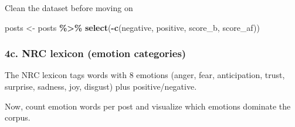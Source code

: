 \documentclass[
]{article}
\newenvironment{Shaded}{\begin{snugshade}}{\end{snugshade}}
\newcommand{\FunctionTok}[1]{\textcolor[rgb]{0.13,0.29,0.53}{\textbf{#1}}}
\newcommand{\NormalTok}[1]{#1}
\newcommand{\OtherTok}[1]{\textcolor[rgb]{0.56,0.35,0.01}{#1}}
\newcommand{\SpecialCharTok}[1]{\textcolor[rgb]{0.81,0.36,0.00}{\textbf{#1}}}
\begin{document}
Clean the dataset before moving on

\begin{Shaded}
\begin{Highlighting}[]
\NormalTok{posts }\OtherTok{\textless{}{-}}\NormalTok{ posts }\SpecialCharTok{\%\textgreater{}\%} 
  \FunctionTok{select}\NormalTok{(}\SpecialCharTok{{-}}\FunctionTok{c}\NormalTok{(negative, positive, score\_b, score\_af))}
\end{Highlighting}
\end{Shaded}

\subsubsection{4c. NRC lexicon (emotion
categories)}\label{c.-nrc-lexicon-emotion-categories}

The NRC lexicon tags words with 8 emotions (anger, fear, anticipation,
trust, surprise, sadness, joy, disgust) plus positive/negative.

Now, count emotion words per post and visualize which emotions dominate
the corpus.
\end{document}
